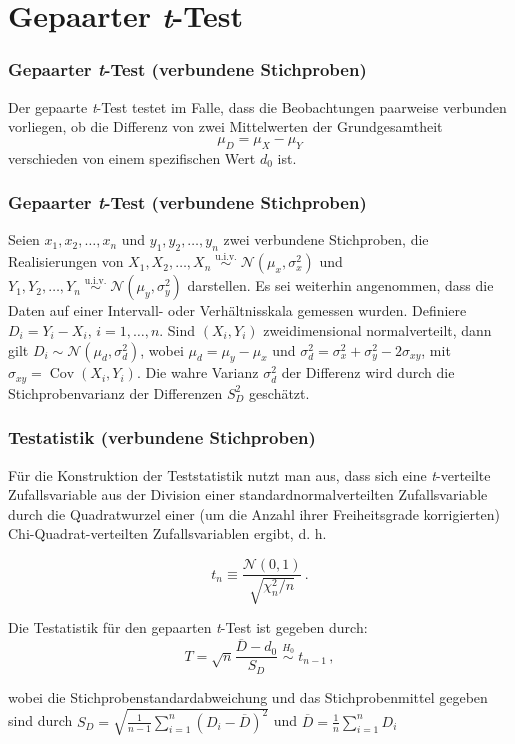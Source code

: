 \documentclass{beamer}
\begin{document}
\section{Gepaarter \textit{t}-Test}
\frame{\sectionpage}
\begin{frame}
\frametitle{Gepaarter \textit{t}-Test (verbundene Stichproben)}
Der gepaarte \textit{t}-Test testet im Falle, dass die Beobachtungen paarweise verbunden vorliegen, ob die Differenz von zwei Mittelwerten der Grundgesamtheit \[\mu_{D} = \mu_{X} - \mu_{Y}\] verschieden von einem spezifischen Wert $d_{0}$ ist.
\end{frame}

   
\begin{frame}
\frametitle{Gepaarter \textit{t}-Test (verbundene Stichproben)}

Seien $x_1, x_2, \dots, x_n$ und $y_1, y_2, \dots, y_n$ zwei verbundene Stichproben, die Realisierungen von $X_1, X_2, \dots, X_n  \; \stackrel{\mathrm{u.i.v.}}{\sim} \; \mathcal{N}(\mu_{x}, \sigma_{x}^2)$ und $Y_1, Y_2, \dots, Y_n  \; \stackrel{\mathrm{u.i.v.}}{\sim} \; \mathcal{N}(\mu_{y}, \sigma_{y}^2)$ darstellen. Es sei weiterhin angenommen, dass die Daten auf einer Intervall- oder Verhältnisskala gemessen wurden. Definiere $D_{i} = Y_{i} - X_{i}, \, i = 1, \ldots, n$. Sind $(X_i, Y_i)$ zweidimensional normalverteilt, dann gilt $D_{i} \sim \mathcal{N}(\mu_{d}, \sigma^2_{d})$, wobei $\mu_{d} = \mu_{y} - \mu_{x}$ und $\sigma_{d}^2 = \sigma_{x}^2 + \sigma_{y}^2 -2\sigma_{xy}$, mit $\sigma_{xy}  = \operatorname{Cov}(X_{i}, Y_{i})$. Die wahre Varianz $\sigma_{d}^2$ der Differenz wird durch die Stichprobenvarianz der Differenzen $S^2_{D}$ geschätzt.
\end{frame}

\begin{frame}
\frametitle{Testatistik (verbundene Stichproben)}

Für die Konstruktion der Teststatistik nutzt man aus, dass sich eine \textit{t}-verteilte Zufallsvariable aus der Division einer standardnormalverteilten Zufallsvariable durch die Quadratwurzel einer (um die Anzahl ihrer Freiheitsgrade korrigierten) Chi-Quadrat-verteilten Zufallsvariablen ergibt, d. h. 

\[t_n\equiv\frac{\mathcal{N}(0,1)}{\sqrt{\chi_n^2/n}}\,.\]

Die Testatistik für den gepaarten \textit{t}-Test ist gegeben durch:
\[ T=\sqrt{n}\frac{\overline{D}-d_0}{S_D}  \; \stackrel{H_0}{\sim} \; t_{n-1}\,,\]

wobei die Stichprobenstandardabweichung und das Stichprobenmittel gegeben sind durch $S_D = \sqrt{ \frac{1}{n-1}\sum_{i=1}^n (D_i-\overline{D})^2 }$ und $\overline{D} = \frac{1}n\sum_{i=1}^n D_i$

\end{frame}
\end{document}
